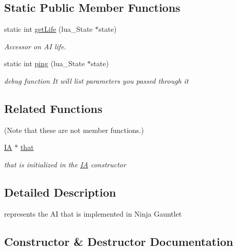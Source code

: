 \subsection*{Static Public Member Functions}
\begin{DoxyCompactItemize}
\item 
\mbox{\label{class_i_a_a1d8f2d91effd6eab9610763bb324d8cd}} 
static int \hyperlink{class_i_a_a1d8f2d91effd6eab9610763bb324d8cd}{get\+Life} (lua\+\_\+\+State $\ast$state)
\begin{DoxyCompactList}\small\item\em Accessor on AI life. \end{DoxyCompactList}\item 
\mbox{\label{class_i_a_af8df32744539390d12d6748f0edf0311}} 
static int \hyperlink{class_i_a_af8df32744539390d12d6748f0edf0311}{ping} (lua\+\_\+\+State $\ast$state)
\begin{DoxyCompactList}\small\item\em debug function It will list parameters you passed through it \end{DoxyCompactList}\end{DoxyCompactItemize}
\subsection*{Related Functions}
(Note that these are not member functions.) \begin{DoxyCompactItemize}
\item 
\mbox{\label{class_i_a_a0a306658767e56dd5adfeb29cf207495}} 
\hyperlink{class_i_a}{IA} $\ast$ \hyperlink{class_i_a_a0a306658767e56dd5adfeb29cf207495}{that}
\begin{DoxyCompactList}\small\item\em that is initialized in the \hyperlink{class_i_a}{IA} constructor \end{DoxyCompactList}\end{DoxyCompactItemize}


\subsection{Detailed Description}
represents the AI that is implemented in Ninja Gauntlet 

\subsection{Constructor \& Destructor Documentation}
\mbox{\label{class_i_a_a5ec5e30441ce9163caf40cbb763c18df}} 
